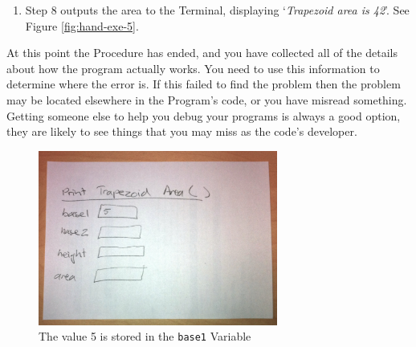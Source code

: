 \begin{enumerate}
  \item Step 8 outputs the area to the Terminal, displaying `\emph{Trapezoid area is 42}'. See Figure \ref{fig:hand-exe-5}.
\end{enumerate} 

At this point the Procedure has ended, and you have collected all of the details about how the program actually works. You need to use this information to determine where the error is. If this failed to find the problem then the problem may be located elsewhere in the Program's code, or you have misread something. Getting someone else to help you debug your programs is always a good option, they are likely to see things that you may miss as the code's developer.


\begin{figure}[htbp]
   \centering
   \includegraphics[width=0.7\textwidth]{./topics/storing-using-data/images/hand-exe-2} 
   \caption{The value 5 is stored in the \texttt{base1} Variable}
   \label{fig:hand-exe-2}
\end{figure}

